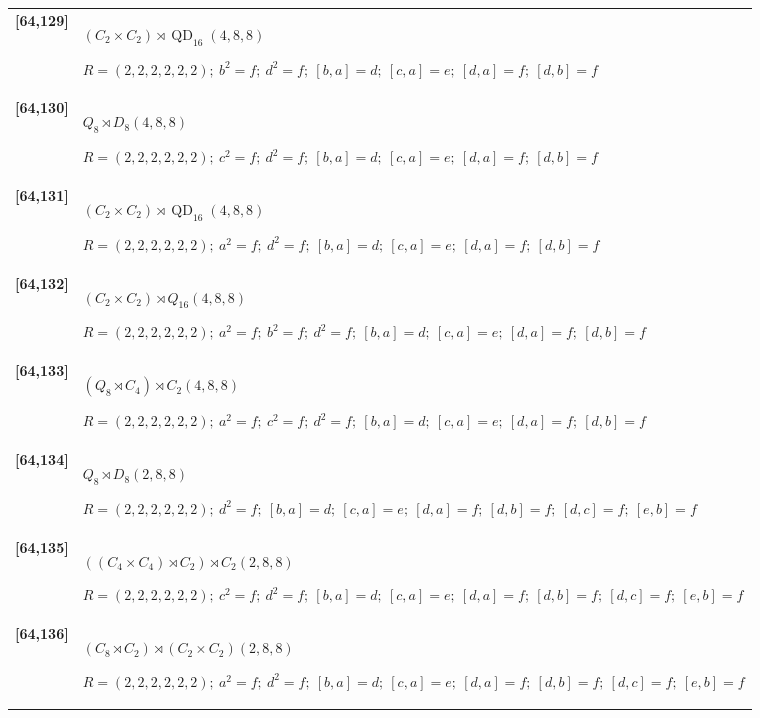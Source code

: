 \documentclass[UTF8,fontset=fandol,11pt,a4paper]{ctexart}
\begin{document}
\begin{longtable}{@{}p{17mm}>{\raggedright\arraybackslash}p{141mm}@{}}
\textbf{[64,129]} & $(C_{2}\times C_{2})\rtimes \operatorname{QD}_{16}$\quad $(4,8,8)$\par\(R=(2,2,2,2,2,2);\allowbreak\ b^{2}=f;\allowbreak\ d^{2}=f;\allowbreak\ [b,a]=d;\allowbreak\ [c,a]=e;\allowbreak\ [d,a]=f;\allowbreak\ [d,b]=f\)\\[3pt]

\textbf{[64,130]} & $Q_{8}\rtimes D_{8}$\quad $(4,8,8)$\par\(R=(2,2,2,2,2,2);\allowbreak\ c^{2}=f;\allowbreak\ d^{2}=f;\allowbreak\ [b,a]=d;\allowbreak\ [c,a]=e;\allowbreak\ [d,a]=f;\allowbreak\ [d,b]=f\)\\[3pt]

\textbf{[64,131]} & $(C_{2}\times C_{2})\rtimes \operatorname{QD}_{16}$\quad $(4,8,8)$\par\(R=(2,2,2,2,2,2);\allowbreak\ a^{2}=f;\allowbreak\ d^{2}=f;\allowbreak\ [b,a]=d;\allowbreak\ [c,a]=e;\allowbreak\ [d,a]=f;\allowbreak\ [d,b]=f\)\\[3pt]

\textbf{[64,132]} & $(C_{2}\times C_{2})\rtimes Q_{16}$\quad $(4,8,8)$\par\(R=(2,2,2,2,2,2);\allowbreak\ a^{2}=f;\allowbreak\ b^{2}=f;\allowbreak\ d^{2}=f;\allowbreak\ [b,a]=d;\allowbreak\ [c,a]=e;\allowbreak\ [d,a]=f;\allowbreak\ [d,b]=f\)\\[3pt]

\textbf{[64,133]} & $(Q_{8}\rtimes C_{4})\rtimes C_{2}$\quad $(4,8,8)$\par\(R=(2,2,2,2,2,2);\allowbreak\ a^{2}=f;\allowbreak\ c^{2}=f;\allowbreak\ d^{2}=f;\allowbreak\ [b,a]=d;\allowbreak\ [c,a]=e;\allowbreak\ [d,a]=f;\allowbreak\ [d,b]=f\)\\[3pt]

\textbf{[64,134]} & $Q_{8}\rtimes D_{8}$\quad $(2,8,8)$\par\(R=(2,2,2,2,2,2);\allowbreak\ d^{2}=f;\allowbreak\ [b,a]=d;\allowbreak\ [c,a]=e;\allowbreak\ [d,a]=f;\allowbreak\ [d,b]=f;\allowbreak\ [d,c]=f;\allowbreak\ [e,b]=f\)\\[3pt]

\textbf{[64,135]} & $((C_{4}\times C_{4})\rtimes C_{2})\rtimes C_{2}$\quad $(2,8,8)$\par\(R=(2,2,2,2,2,2);\allowbreak\ c^{2}=f;\allowbreak\ d^{2}=f;\allowbreak\ [b,a]=d;\allowbreak\ [c,a]=e;\allowbreak\ [d,a]=f;\allowbreak\ [d,b]=f;\allowbreak\ [d,c]=f;\allowbreak\ [e,b]=f\)\\[3pt]

\textbf{[64,136]} & $(C_{8}\rtimes C_{2})\rtimes (C_{2}\times C_{2})$\quad $(2,8,8)$\par\(R=(2,2,2,2,2,2);\allowbreak\ a^{2}=f;\allowbreak\ d^{2}=f;\allowbreak\ [b,a]=d;\allowbreak\ [c,a]=e;\allowbreak\ [d,a]=f;\allowbreak\ [d,b]=f;\allowbreak\ [d,c]=f;\allowbreak\ [e,b]=f\)\\[3pt]


\end{longtable}
\end{document}
